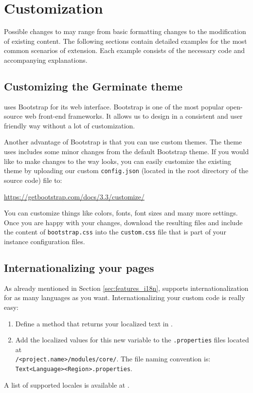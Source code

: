 \section{Customization}
\label{sec:examples}
Possible changes to {\germinate} may range from basic formatting changes to the modification of existing content. The following sections contain detailed examples for the most common scenarios of extension. Each example consists of the necessary code and accompanying explanations.

\subsection{Customizing the Germinate theme}
{\germinate} uses Bootstrap \cite{Bootstrap} for its web interface. Bootstrap is one of the most popular open-source web front-end frameworks. It allows us to design {\germinate} in a consistent and user friendly way without a lot of customization.

Another advantage of Bootstrap is that you can use custom themes. The theme {\germinate} uses includes some minor changes from the default Bootstrap theme. If you would like to make changes to the way {\germinate} looks, you can easily customize the existing theme by uploading our custom \texttt{config.json} (located in the root directory of the source code) file to:
\begin{center}
	\url{https://getbootstrap.com/docs/3.3/customize/}
\end{center}
\noindent You can customize things like colors, fonts, font sizes and many more settings. Once you are happy with your changes, download the resulting files and include the content of \texttt{bootstrap.css} into the \texttt{custom.css} file that is part of your instance configuration files.

\subsection{Internationalizing your pages}
\label{sec:example_i18n}
As already mentioned in Section \ref{sec:features_i18n}, {\germinate} supports internationalization for as many languages as you want.
Internationalizing your custom code is really easy:
\begin{enumerate}
    \item Define a method that returns your localized text in .
    \item Add the localized values for this new variable to the \texttt{.properties} files located at\\\instanceStuff\texttt{/<project.name>/modules/core/}. The file naming convention is: \texttt{Text\textunderscore\allowbreak <Language>\allowbreak \textunderscore <Region>.properties}.
\end{enumerate}
\noindent
A list of supported locales is available at \cite{JavaLocales}.

